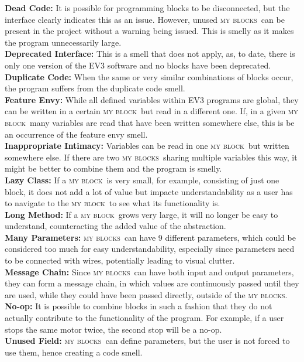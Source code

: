 \documentclass[conference]{IEEEtran}
\newcommand{\mbs}{\textsc{my blocks}}
\newcommand{\mb}{\textsc{my block}}
\begin{document}
\noindent \textbf{Dead Code:} It is possible for programming blocks to be disconnected, but the interface clearly indicates this as an issue. However, unused \mbs~can be present in the project without a warning being issued. This is smelly as it makes the program unnecessarily large.\\
\textbf{Deprecated Interface:} This is a smell that does not apply, as, to date, there is only one version of the EV3 software and no blocks have been deprecated.\\
\textbf{Duplicate Code:} When the same or very similar combinations of blocks occur, the program suffers from the duplicate code smell.\\
\textbf{Feature Envy:} While all defined variables within EV3 programs are global, they can be written in a certain \mb~but read in a different one. If, in a given \mb~many variables are read that have been written somewhere else, this is be an occurrence of the feature envy smell. \\
\textbf{Inappropriate Intimacy:} Variables can be read in one \mb~but written somewhere else. If there are two \mbs~sharing multiple variables this way, it might be better to combine them and the program is smelly.\\
\textbf{Lazy Class:} If a \mb~is very small, for example, consisting of just one block, it does not add a lot of value but impacte understandability as a user has to navigate to the \mb~to see what its functionality is.\\
\textbf{Long Method:} If a \mb~grows very large, it will no longer be easy to understand, counteracting the added value of the abstraction.\\
\textbf{Many Parameters:} \mbs~can have 9 different parameters, which could be considered too much for easy understandability, especially since parameters need to be connected with wires, potentially leading to visual clutter.\\
\textbf{Message Chain:} Since \mbs~can have both input and output parameters, they can form a message chain, in which values are continuously passed until they are used, while they could have been passed directly, outside of the \mbs.\\
\textbf{No-op:} It is possible to combine blocks in such a fashion that they do not actually contribute to the functionality of the program. For example, if a user stops the same motor twice, the second stop will be a no-op.\\
\textbf{Unused Field:}  \mbs~can define parameters, but the user is not forced to use them, hence creating a code smell.
\end{document}
